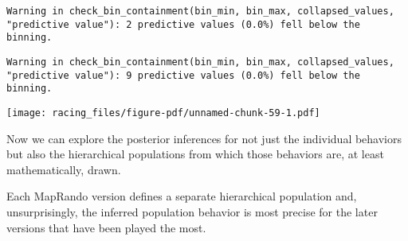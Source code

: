 \documentclass[
  letterpaper,
  DIV=11,
  numbers=noendperiod]{scrartcl}
\begin{document}
\begin{verbatim}
Warning in check_bin_containment(bin_min, bin_max, collapsed_values,
"predictive value"): 2 predictive values (0.0%) fell below the binning.
\end{verbatim}

\begin{verbatim}
Warning in check_bin_containment(bin_min, bin_max, collapsed_values,
"predictive value"): 9 predictive values (0.0%) fell below the binning.
\end{verbatim}

\texttt{[image: racing\_files/figure-pdf/unnamed-chunk-59-1.pdf]}

Now we can explore the posterior inferences for not just the individual
behaviors but also the hierarchical populations from which those
behaviors are, at least mathematically, drawn.

Each MapRando version defines a separate hierarchical population and,
unsurprisingly, the inferred population behavior is most precise for the
later versions that have been played the most.
\end{document}

